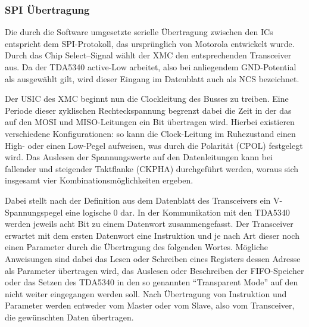 \subsubsection*{SPI Übertragung}
Die durch die Software umgesetzte serielle Übertragung zwischen den \acp{IC} entspricht dem \ac{SPI}-Protokoll, das ursprünglich von Motorola entwickelt wurde\cite{BuchSPI}. Durch das Chip Select–Signal wählt der XMC den entsprechenden Transceiver aus. Da der TDA5340 active-Low arbeitet, also bei anliegendem \ac{GND}-Potential als ausgewählt gilt, wird dieser Eingang im Datenblatt auch als \acf{NCS} bezeichnet. 

Der \ac{USIC} des XMC beginnt nun die Clockleitung des Busses zu treiben. Eine Periode dieser zyklischen Rechteckspannung begrenzt dabei die Zeit in der das auf den \ac{MOSI} und \ac{MISO}-Leitungen ein Bit übertragen wird. Hierbei existieren verschiedene Konfigurationen: so kann die Clock-Leitung im Ruhezustand einen High- oder einen Low-Pegel aufweisen, was durch die Polarität (CPOL) festgelegt wird. Das Auslesen der Spannungswerte auf den Datenleitungen kann bei fallender und steigender Taktflanke (CKPHA) durchgeführt werden, woraus sich insgesamt vier Kombinationsmöglichkeiten ergeben.

Dabei stellt nach der Definition aus dem Datenblatt des Transceivers ein \unit[0]{V}-Spannungspegel eine logische $0$ dar. In der Kommunikation mit den TDA5340 werden jeweils acht Bit zu einem Datenwort zusammengefasst. Der Transceiver erwartet mit dem ersten Datenwort eine Instruktion und je nach Art dieser noch einen Parameter durch die Übertragung des folgenden Wortes. Mögliche Anweisungen sind dabei das Lesen oder Schreiben eines Registers dessen Adresse als Parameter übertragen wird, das Auslesen oder Beschreiben der \ac{FIFO}-Speicher oder das Setzen des TDA5340 in den so genannten \enquote{Transparent Mode} auf den nicht weiter eingegangen werden soll. Nach Übertragung von Instruktion und Parameter werden entweder vom Master oder vom Slave, also vom Transceiver, die gewünschten Daten übertragen.


